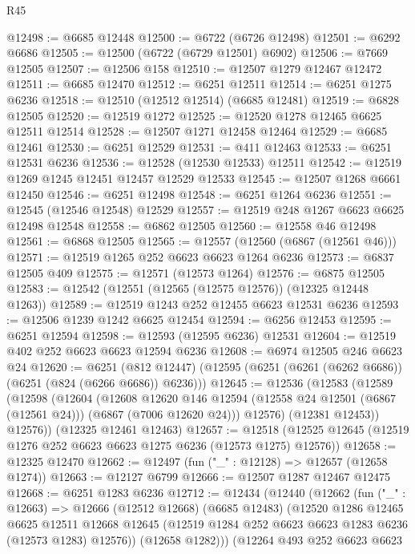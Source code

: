 \begin{lexlean}{R45}
\begin{coremodule}
{@12498 := @6685 @12448
@12500 := @6722 (@6726 @12498)
@12501 := @6292 @6686
@12505 := @12500 (@6722 (@6729 @12501) @6902)
@12506 := @7669 @12505
@12507 := @12506 @158
@12510 := @12507 @1279 @12467 @12472
@12511 := @6685 @12470
@12512 := @6251 @12511
@12514 := @6251 @1275 @6236
@12518 := @12510 (@12512 @12514) (@6685 @12481)
@12519 := @6828 @12505
@12520 := @12519 @1272
@12525 := @12520 @1278 @12465 @6625 @12511 @12514
@12528 := @12507 @1271 @12458 @12464
@12529 := @6685 @12461
@12530 := @6251 @12529
@12531 := @411 @12463
@12533 := @6251 @12531 @6236
@12536 := @12528 (@12530 @12533) @12511
@12542 := @12519 @1269 @1245 @12451 @12457 @12529 @12533
@12545 := @12507 @1268 @6661 @12450
@12546 := @6251 @12498
@12548 := @6251 @1264 @6236
@12551 := @12545 (@12546 @12548) @12529
@12557 := @12519 @248 @1267 @6623 @6625 @12498 @12548
@12558 := @6862 @12505
@12560 := @12558 @46 @12498
@12561 := @6868 @12505
@12565 := @12557 (@12560 (@6867 (@12561 @46)))
@12571 := @12519 @1265 @252 @6623 @6623 @1264 @6236
@12573 := @6837 @12505 @409
@12575 := @12571 (@12573 @1264)
@12576 := @6875 @12505
@12583 := @12542 (@12551 (@12565 (@12575 @12576)) (@12325 @12448 @1263))
@12589 := @12519 @1243 @252 @12455 @6623 @12531 @6236
@12593 := @12506 @1239 @1242 @6625 @12454
@12594 := @6256 @12453
@12595 := @6251 @12594
@12598 := @12593 (@12595 @6236) @12531
@12604 := @12519 @402 @252 @6623 @6623 @12594 @6236
@12608 := @6974 @12505 @246 @6623 @24
@12620 := @6251
    (@812 @12447)
    (@12595 (@6251 (@6261 (@6262 @6686)) (@6251 (@824 (@6266 @6686)) @6236)))
@12645 := @12536
    (@12583
      (@12589
        (@12598
          (@12604
            (@12608
              @12620
              @146
              @12594
              (@12558 @24 @12501 (@6867 (@12561 @24)))
              (@6867 (@7006 @12620 @24)))
            @12576)
          (@12381 @12453))
        @12576))
    (@12325 @12461 @12463)
@12657 := @12518 (@12525 @12645 (@12519 @1276 @252 @6623 @6623 @1275 @6236 (@12573 @1275) @12576))
@12658 := @12325 @12470
@12662 := @12497 (fun ("_" : @12128) => @12657 (@12658 @1274))
@12663 := @12127 @6799
@12666 := @12507 @1287 @12467 @12475
@12668 := @6251 @1283 @6236
@12712 := @12434
    (@12440
      (@12662
        (fun ("_" : @12663) =>
        @12666
          (@12512 @12668)
          (@6685 @12483)
          (@12520
            @1286
            @12465
            @6625
            @12511
            @12668
            @12645
            (@12519 @1284 @252 @6623 @6623 @1283 @6236 (@12573 @1283) @12576))
          (@12658 @1282)))
      (@12264
        @493
        @252
        @6623
        @6623
}
\end{coremodule}
\end{lexlean}
